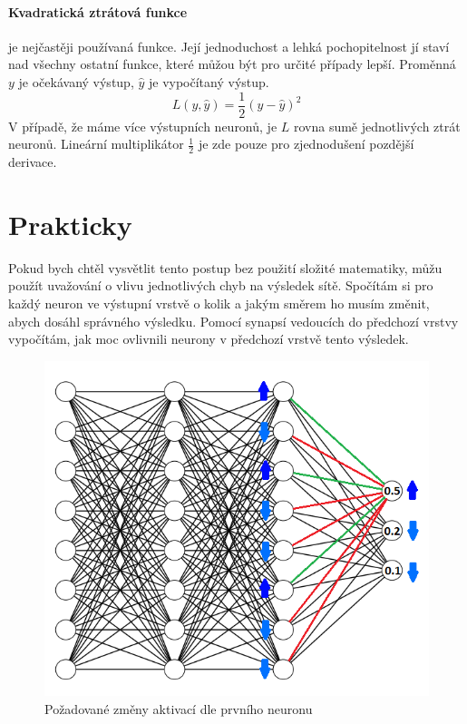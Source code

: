 \documentclass[12pt,a4paper]{report}
\begin{document}
	\paragraph{Kvadratická ztrátová funkce}
	je nejčastěji používaná funkce. Její jednoduchost a lehká pochopitelnost jí staví nad všechny ostatní funkce, které můžou být pro určité případy lepší. Proměnná $y$ je očekávaný výstup, $\hat{y}$ je vypočítaný výstup.
	$$L(y,\hat{y})=\frac{1}{2}(y-\hat{y})^2$$
	V případě, že máme více výstupních neuronů, je $L$ rovna sumě jednotlivých ztrát neuronů. Lineární multiplikátor $\frac{1}{2}$ je zde pouze pro zjednodušení pozdější derivace.
	
	\section{Prakticky}
	Pokud bych chtěl vysvětlit tento postup bez použití složité matematiky, můžu použít uvažování o vlivu jednotlivých chyb na výsledek sítě. Spočítám si pro každý neuron ve výstupní vrstvě o kolik a jakým směrem ho musím změnit, abych dosáhl správného výsledku. Pomocí synapsí vedoucích do předchozí vrstvy vypočítám, jak moc ovlivnili neurony v předchozí vrstvě tento výsledek.
	
	\begin{figure}[h]
		\centering
		\includegraphics[width=15cm]{images/nn8-8-8-3_krok_1}
		\caption{Požadované změny aktivací dle prvního neuronu}
	\end{figure}
	
\end{document}
